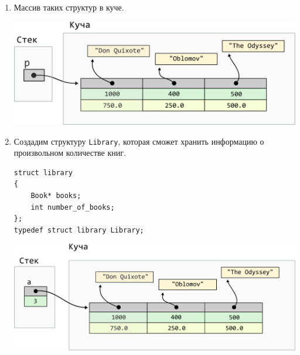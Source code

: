 \documentclass[10pt]{article}
\newcommand{\mallocImagesScale}{0.72}
\begin{document}
\begin{enumerate}
\item Массив таких структур в куче.
\begin{center}
\includegraphics[scale=\mallocImagesScale]{../images/malloc_homework/08heap_array_struct_book_title_heap.png}
\end{center}


\item Создадим структуру \texttt{Library}, которая сможет хранить информацию о произвольном количестве книг.
\begin{lstlisting}
struct library 
{
    Book* books;
    int number_of_books;
};
typedef struct library Library;
\end{lstlisting}

\begin{center}
\includegraphics[scale=\mallocImagesScale]{../images/malloc_homework/09stack_struct_book_library.png}
\end{center}


\end{enumerate}
\end{document}
